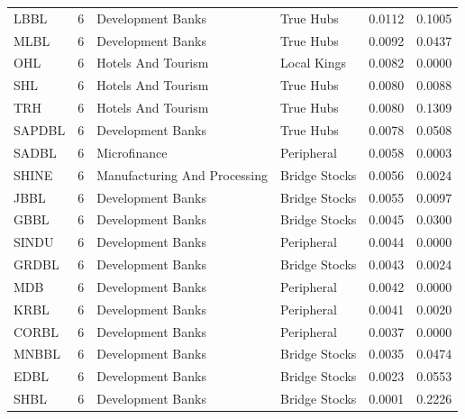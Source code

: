 \begin{longtable}{l r l l r r}
LBBL & 6 & Development Banks & True Hubs & 0.0112 & 0.1005 \\
MLBL & 6 & Development Banks & True Hubs & 0.0092 & 0.0437 \\
OHL & 6 & Hotels And Tourism & Local Kings & 0.0082 & 0.0000 \\
SHL & 6 & Hotels And Tourism & True Hubs & 0.0080 & 0.0088 \\
TRH & 6 & Hotels And Tourism & True Hubs & 0.0080 & 0.1309 \\
SAPDBL & 6 & Development Banks & True Hubs & 0.0078 & 0.0508 \\
SADBL & 6 & Microfinance & Peripheral & 0.0058 & 0.0003 \\
SHINE & 6 & Manufacturing And Processing & Bridge Stocks & 0.0056 & 0.0024 \\
JBBL & 6 & Development Banks & Bridge Stocks & 0.0055 & 0.0097 \\
GBBL & 6 & Development Banks & Bridge Stocks & 0.0045 & 0.0300 \\
SINDU & 6 & Development Banks & Peripheral & 0.0044 & 0.0000 \\
GRDBL & 6 & Development Banks & Bridge Stocks & 0.0043 & 0.0024 \\
MDB & 6 & Development Banks & Peripheral & 0.0042 & 0.0000 \\
KRBL & 6 & Development Banks & Peripheral & 0.0041 & 0.0020 \\
CORBL & 6 & Development Banks & Peripheral & 0.0037 & 0.0000 \\
MNBBL & 6 & Development Banks & Bridge Stocks & 0.0035 & 0.0474 \\
EDBL & 6 & Development Banks & Bridge Stocks & 0.0023 & 0.0553 \\
SHBL & 6 & Development Banks & Bridge Stocks & 0.0001 & 0.2226 \\
\end{longtable}
